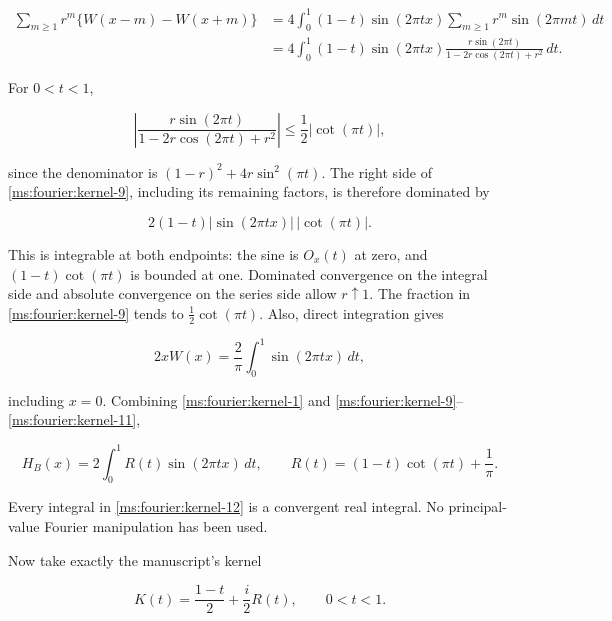 \begin{equation}
 \begin{aligned}
 \sum_{m\ge1}r^m\{W(x-m)-W(x+m)\}
   &=4\int_0^1(1-t)\sin(2\pi tx)
               \sum_{m\ge1}r^m\sin(2\pi mt)\,dt\\
   &=4\int_0^1(1-t)\sin(2\pi tx)
        \frac{r\sin(2\pi t)}{1-2r\cos(2\pi t)+r^2}\,dt.
 \end{aligned}                                                    \label{ms:fourier:kernel-9}
\end{equation}

For \(0<t<1\),

\begin{equation}
 \left|\frac{r\sin(2\pi t)}{1-2r\cos(2\pi t)+r^2}\right|
 \le\frac12|\cot(\pi t)|,
 \label{ms:fourier:kernel-10}
\end{equation}

since the denominator is
\((1-r)^2+4r\sin^2(\pi t)\). The right side of \eqref{ms:fourier:kernel-9}, including its
remaining factors, is therefore dominated by

\[
 2(1-t)|\sin(2\pi tx)|\,|\cot(\pi t)|.
\]

This is integrable at both endpoints: the sine is \(O_x(t)\) at zero,
and \((1-t)\cot(\pi t)\) is bounded at one. Dominated convergence on
the integral side and absolute convergence on the series side allow
\(r\uparrow1\). The fraction in \eqref{ms:fourier:kernel-9} tends to
\(\tfrac12\cot(\pi t)\). Also, direct integration gives

\begin{equation}
 2xW(x)=\frac2\pi\int_0^1\sin(2\pi tx)\,dt,          \label{ms:fourier:kernel-11}
\end{equation}

including \(x=0\). Combining \eqref{ms:fourier:kernel-1} and \eqref{ms:fourier:kernel-9}–\eqref{ms:fourier:kernel-11},

\begin{equation}
 H_B(x)=2\int_0^1 R(t)\sin(2\pi tx)\,dt,
 \qquad R(t)=(1-t)\cot(\pi t)+\frac1\pi.
 \label{ms:fourier:kernel-12}
\end{equation}

Every integral in \eqref{ms:fourier:kernel-12} is a convergent real integral. No principal-value
Fourier manipulation has been used.

Now take exactly the manuscript's kernel

\begin{equation}
 K(t)=\frac{1-t}{2}+\frac i2 R(t),\qquad0<t<1.
 \label{ms:fourier:kernel-13}
\end{equation}

